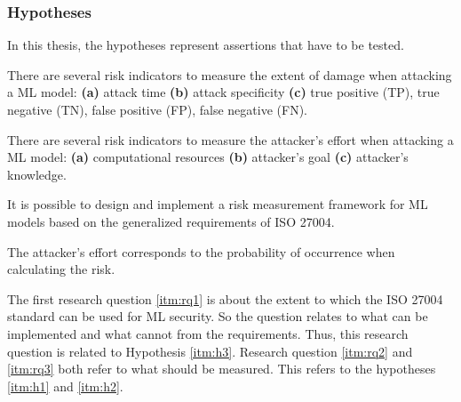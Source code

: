 \subsubsection*{Hypotheses}

In this thesis, the hypotheses represent assertions that have to be tested.


\begin{hypotheses}
  \item There are several risk indicators to measure the extent of damage when attacking a ML model: \textbf{(a)} attack time \textbf{(b)} attack specificity \textbf{(c)} true positive (TP), true negative (TN), false positive (FP), false negative (FN). \label{itm:h1}
  \item There are several risk indicators to measure the attacker's effort when attacking a ML model: \textbf{(a)} computational resources \textbf{(b)} attacker's goal \textbf{(c)} attacker's knowledge. \label{itm:h2}
  \item It is possible to design and implement a risk measurement framework for ML models based on the generalized requirements of ISO 27004. \label{itm:h3}
  \item The attacker's effort corresponds to the probability of occurrence when calculating the risk. \label{itm:h4}
\end{hypotheses}

The first research question \ref{itm:rq1} is about the extent to which the ISO 27004 standard can be used for ML security. So the question relates to what can be implemented and what cannot from the requirements. Thus, this research question is related to Hypothesis \ref{itm:h3}. Research question \ref{itm:rq2} and \ref{itm:rq3} both refer to what should be measured. This refers to the hypotheses \ref{itm:h1} and \ref{itm:h2}.
